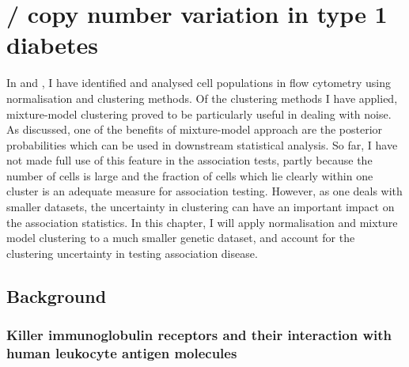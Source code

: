 %

\chapter[KIR3DL1/KIR3DS1 copy number variation in type 1 diabetes]{ \label{chapter:kir} \protect{}/\protect{} copy number variation in type 1 diabetes }


In  and , I have identified and analysed cell populations in flow cytometry using normalisation and clustering methods.
Of the clustering methods I have applied, mixture-model clustering proved to be particularly useful in dealing with noise.
As discussed, one of the benefits of mixture-model approach are the posterior probabilities which can be used in downstream statistical analysis.
So far, I have not made full use of this feature in the association tests, partly because the number of cells is large
and the fraction of cells which lie clearly within one cluster is an adequate measure for association testing.
However, as one deals with smaller datasets, the uncertainty in clustering can have an important impact on the association statistics.
In this chapter, I will apply normalisation and mixture model clustering to a much smaller genetic dataset,
and account for the clustering uncertainty in testing association disease.


\section{Background}

\subsection{Killer immunoglobulin receptors and their interaction with human leukocyte antigen molecules}

